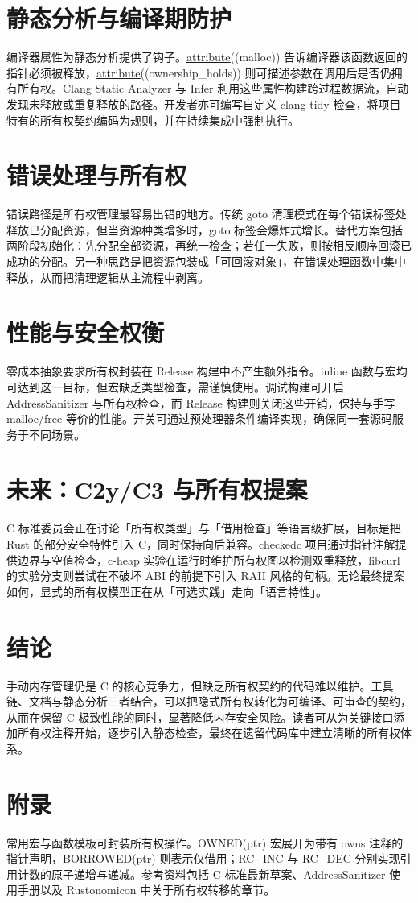 \chapter{静态分析与编译期防护}
编译器属性为静态分析提供了钩子。\underline{\underline{attribute}}((malloc)) 告诉编译器该函数返回的指针必须被释放，\underline{\underline{attribute}}((ownership\_{}holds)) 则可描述参数在调用后是否仍拥有所有权。Clang Static Analyzer 与 Infer 利用这些属性构建跨过程数据流，自动发现未释放或重复释放的路径。开发者亦可编写自定义 clang-tidy 检查，将项目特有的所有权契约编码为规则，并在持续集成中强制执行。\par
\chapter{错误处理与所有权}
错误路径是所有权管理最容易出错的地方。传统 goto 清理模式在每个错误标签处释放已分配资源，但当资源种类增多时，goto 标签会爆炸式增长。替代方案包括两阶段初始化：先分配全部资源，再统一检查；若任一失败，则按相反顺序回滚已成功的分配。另一种思路是把资源包装成「可回滚对象」，在错误处理函数中集中释放，从而把清理逻辑从主流程中剥离。\par
\chapter{性能与安全权衡}
零成本抽象要求所有权封装在 Release 构建中不产生额外指令。inline 函数与宏均可达到这一目标，但宏缺乏类型检查，需谨慎使用。调试构建可开启 AddressSanitizer 与所有权检查，而 Release 构建则关闭这些开销，保持与手写 malloc/free 等价的性能。开关可通过预处理器条件编译实现，确保同一套源码服务于不同场景。\par
\chapter{未来：C2y/C3 与所有权提案}
C 标准委员会正在讨论「所有权类型」与「借用检查」等语言级扩展，目标是把 Rust 的部分安全特性引入 C，同时保持向后兼容。checkedc 项目通过指针注解提供边界与空值检查，c-heap 实验在运行时维护所有权图以检测双重释放，libcurl 的实验分支则尝试在不破坏 ABI 的前提下引入 RAII 风格的句柄。无论最终提案如何，显式的所有权模型正在从「可选实践」走向「语言特性」。\par
\chapter{结论}
手动内存管理仍是 C 的核心竞争力，但缺乏所有权契约的代码难以维护。工具链、文档与静态分析三者结合，可以把隐式所有权转化为可编译、可审查的契约，从而在保留 C 极致性能的同时，显著降低内存安全风险。读者可从为关键接口添加所有权注释开始，逐步引入静态检查，最终在遗留代码库中建立清晰的所有权体系。\par
\chapter{附录}
常用宏与函数模板可封装所有权操作。OWNED(ptr) 宏展开为带有 owns 注释的指针声明，BORROWED(ptr) 则表示仅借用；RC\_{}INC 与 RC\_{}DEC 分别实现引用计数的原子递增与递减。参考资料包括 C 标准最新草案、AddressSanitizer 使用手册以及 Rustonomicon 中关于所有权转移的章节。\par

